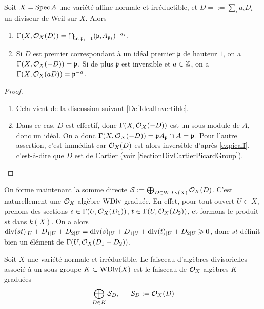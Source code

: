 \begin{prop}\label{divaff}
Soit $X=\operatorname{Spec} A$ une variété affine normale et irréductible, et $D=:=\sum_i a_iD_i$ un diviseur de Weil sur $X$. Alors
\begin{enumerate}
\item $\Gamma(X,\mathcal{O}_X(D))=\bigcap_{\operatorname{ht} \mathfrak{p}_i=1}(\mathfrak{p}_iA_{\mathfrak{p}_i})^{-a_i}$.
\item Si $D$ est premier correspondant à un idéal premier $\mathfrak{p}$ de hauteur $1$, on a $\Gamma(X,\mathcal{O}_X(-D))=\mathfrak{p}$. Si de plus $\mathfrak{p}$ est inversible et $a\in \mathbb{Z}$, on a $\Gamma(X,\mathcal{O}_X(aD))=\mathfrak{p}^{-a}$.
\end{enumerate}
\end{prop}
\begin{proof}
\begin{enumerate}
\item Cela vient de la discussion suivant \ref{DefIdealInvertible}.
\item Dans ce cas, $D$ est effectif, donc $\Gamma(X,\mathcal{O}_X(-D))$ est un sous-module de $A$, donc un idéal. On a donc $\Gamma(X,\mathcal{O}_X(-D))=\mathfrak{p}A_\mathfrak{p}\cap A=\mathfrak{p}$. Pour l'autre assertion, c'est immédiat car $\mathcal{O}_X(D)$ est alors inversible d'après \ref{expicaff}, c'est-à-dire que $D$ est de Cartier (voir \ref{SectionDivCartierPicardGroup}).
\end{enumerate}
\end{proof}

On forme maintenant la somme directe $\mathcal{S}:=\bigoplus_{D\in \operatorname{WDiv}(X)}\mathcal{O}_X(D)$. C'est naturellement une $\mathcal{O}_X$-algèbre $\operatorname{WDiv}$-graduée. En effet, pour tout ouvert $U\subset X$, prenons des sections $s\in\Gamma(U,\mathcal{O}_X(D_1))$, $t\in \Gamma(U,\mathcal{O}_X(D_2))$, et formons le produit $st$ dans $k(X)$. On a alors $\operatorname{div}(st)_{|U}+D_{1|U}+D_{2|U}=\operatorname{div}(s)_{|U}+D_{1|U}+\operatorname{div}(t)_{|U}+D_{2|U}\geqslant 0$, donc $st$ définit bien un élément de $\Gamma(U,\mathcal{O}_X(D_1+D_2))$.

\begin{defn}
Soit $X$ une variété normale et irréductible. Le faisceau d'algèbres divisorielles associé à un sous-groupe $K\subset \operatorname{WDiv}(X)$ est le faisceau de $\mathcal{O}_X$-algèbres $K$-graduées $$\bigoplus_{D\in K}\mathcal{S}_D,\,\,\,\,\,\,\,\,\, \mathcal{S}_D:=\mathcal{O}_X(D)$$ 
\end{defn}


